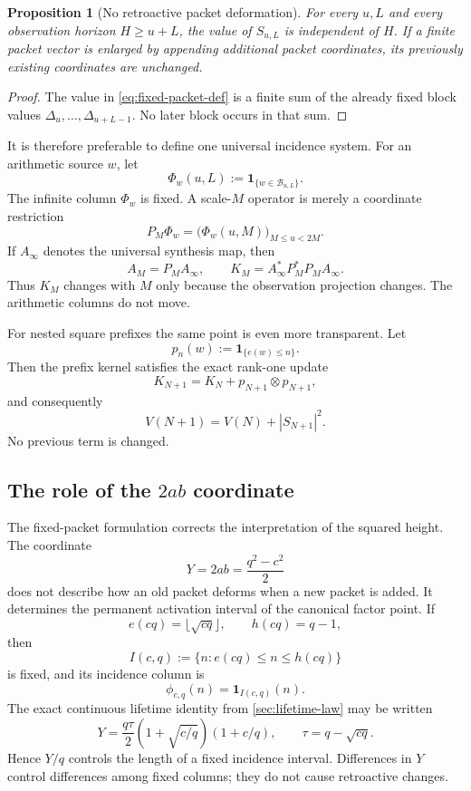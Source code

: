 \documentclass[11pt]{article}
\newtheorem{proposition}[theorem]{Proposition}
\theoremstyle{definition}
\theoremstyle{remark}
\newcommand{\1}{\mathbf{1}}
\begin{document}
\begin{proposition}[No retroactive packet deformation]
\label{prop:no-retroactive}
For every $u,L$ and every observation horizon $H\ge u+L$, the value of
$S_{u,L}$ is independent of $H$.  If a finite packet vector is enlarged by appending
additional packet coordinates, its previously existing coordinates are unchanged.
\end{proposition}

\begin{proof}
The value in \cref{eq:fixed-packet-def} is a finite sum of the already fixed block
values $\Delta_u,\ldots,\Delta_{u+L-1}$.  No later block occurs in that sum.
\end{proof}

It is therefore preferable to define one universal incidence system.  For an
arithmetic source $w$, let
\[
 \Phi_w(u,L):=\1_{\{w\in\mathcal B_{u,L}\}}.
\]
The infinite column $\Phi_w$ is fixed.  A scale-$M$ operator is merely a coordinate
restriction
\[
 P_M\Phi_w=\bigl(\Phi_w(u,M)\bigr)_{M\le u<2M}.
\]
If $A_\infty$ denotes the universal synthesis map, then
\begin{equation}
 A_M=P_MA_\infty,
 \qquad
 K_M=A_\infty^*P_M^*P_MA_\infty.
 \label{eq:universal-restriction}
\end{equation}
Thus $K_M$ changes with $M$ only because the observation projection changes.  The
arithmetic columns do not move.

For nested square prefixes the same point is even more transparent.  Let
\[
 p_n(w):=\1_{\{e(w)\le n\}}.
\]
Then the prefix kernel satisfies the exact rank-one update
\begin{equation}
 K_{N+1}=K_N+p_{N+1}\otimes p_{N+1},
 \label{eq:rank-one-prefix-update}
\end{equation}
and consequently
\begin{equation}
 V(N+1)=V(N)+|S_{N+1}|^2.
 \label{eq:variance-append}
\end{equation}
No previous term is changed.

\subsection{The role of the $2ab$ coordinate}

The fixed-packet formulation corrects the interpretation of the squared height.
The coordinate
\[
 Y=2ab=\frac{q^2-c^2}{2}
\]
does not describe how an old packet deforms when a new packet is added.  It determines
the permanent activation interval of the canonical factor point.  If
\[
 e(cq)=\lfloor\sqrt{cq}\rfloor,
 \qquad h(cq)=q-1,
\]
then
\[
 I(c,q):=\{n:e(cq)\le n\le h(cq)\}
\]
is fixed, and its incidence column is
\[
 \phi_{c,q}(n)=\1_{I(c,q)}(n).
\]
The exact continuous lifetime identity from \cref{sec:lifetime-law} may be written
\begin{equation}
 Y
 =\frac{q\tau}{2}
   \left(1+\sqrt{c/q}\right)\left(1+c/q\right),
 \qquad
 \tau=q-\sqrt{cq}.
 \label{eq:Y-fixed-lifetime}
\end{equation}
Hence $Y/q$ controls the length of a fixed incidence interval.  Differences in
$Y$ control differences among fixed columns; they do not cause retroactive changes.
\end{document}
